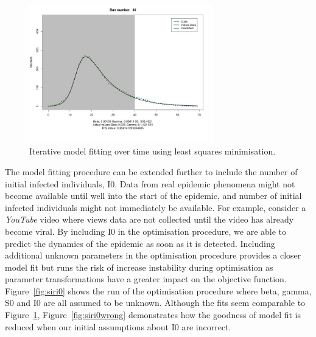 \begin{centering}
\begin{figure}[h!]
  \includegraphics[width=8cm]{images/sirs0_40.jpeg}
\caption{Iterative model fitting over time using least squares
  minimisation.}
\label{fig:sir}
  \end{figure}
\end{centering}

The model fitting procedure can be extended further to include the
number of initial infected individuals, I0. Data from real epidemic
phenomena might not become available until well into the start of the epidemic, and number of initial infected individuals might not immediately
be available. For example, consider a \emph{YouTube} video where views
data are not collected until the video has already become viral. By
including I0 in the optimisation procedure, we
are able to predict the dynamics of the epidemic as soon as it is
detected. Including additional unknown parameters in the
optimisation procedure provides a closer model fit but runs the risk
of increase instability during optimisation as parameter
transformations have a greater impact on the objective
function. Figure~\ref{fig:siri0} shows the run of the optimisation procedure where
beta, gamma, S0 and I0 are all assumed to be unknown. Although the
fits seem comparable to Figure~\ref{fig:sir}, Figure~\ref{fig:siri0wrong} demonstrates how the
goodness of model fit is reduced when our initial assumptions about I0
are incorrect.

